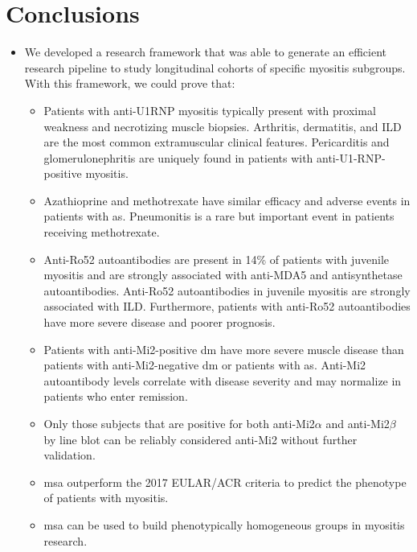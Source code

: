 \chapter{Conclusions}

\begin{itemize}
	
	\item We developed a research framework that was able to generate an efficient research pipeline to study longitudinal cohorts of specific myositis subgroups. With this framework, we could prove that:
	
	\begin{itemize}
		\item Patients with anti-U1RNP myositis typically present with proximal weakness and necrotizing muscle biopsies. Arthritis, dermatitis, and ILD are the most common extramuscular clinical features. Pericarditis and glomerulonephritis are uniquely found in patients with anti-U1-RNP- positive myositis.
		
		\item Azathioprine and methotrexate have similar efficacy and adverse events in patients with \gls{as}. Pneumonitis is a rare but important event in patients receiving methotrexate.
		
		\item Anti-Ro52 autoantibodies are present in 14\% of patients with juvenile myositis and are strongly associated with anti-MDA5 and antisynthetase autoantibodies. Anti-Ro52 autoantibodies in juvenile myositis are strongly associated with ILD. Furthermore, patients with anti-Ro52 autoantibodies have more severe disease and poorer prognosis.
		
		\item Patients with anti-Mi2-positive \gls{dm} have more severe muscle disease than patients with anti-Mi2-negative \gls{dm} or patients with \gls{as}. Anti-Mi2 autoantibody levels correlate with disease severity and may normalize in patients who enter remission.
		
		\item Only those subjects that are positive for both anti-Mi2$\alpha$ and anti-Mi2$\beta$ by line blot can be reliably considered anti-Mi2 without further validation.
		
		\item \gls{msa} outperform the 2017 EULAR/ACR criteria to predict the phenotype of patients with myositis.
		
		\item \gls{msa} can be used to build phenotypically homogeneous groups in myositis research.
	\end{itemize}


\end{itemize}
